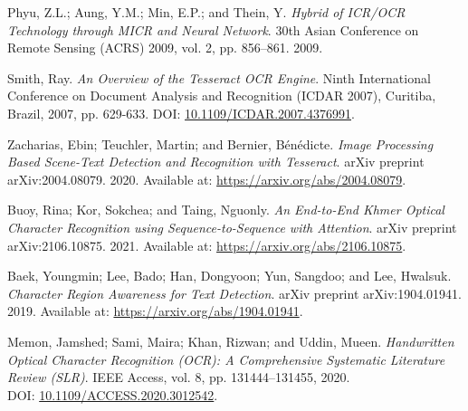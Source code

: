 \begin{thebibliography}{99}
Phyu, Z.L.; Aung, Y.M.; Min, E.P.; and Thein, Y.
\textit{Hybrid of ICR/OCR Technology through MICR and Neural Network}.
30th Asian Conference on Remote Sensing (ACRS) 2009, vol. 2, pp. 856–861.
2009.

Smith, Ray.
\textit{An Overview of the Tesseract OCR Engine}.
Ninth International Conference on Document Analysis and Recognition (ICDAR 2007), Curitiba, Brazil, 2007, pp. 629-633.
DOI: \href{https://doi.org/10.1109/ICDAR.2007.4376991}{10.1109/ICDAR.2007.4376991}.

Zacharias, Ebin; Teuchler, Martin; and Bernier, Bénédicte.
\textit{Image Processing Based Scene-Text Detection and Recognition with Tesseract}.
arXiv preprint arXiv:2004.08079.
2020.
Available at: \href{https://arxiv.org/abs/2004.08079}{https://arxiv.org/abs/2004.08079}.

Buoy, Rina; Kor, Sokchea; and Taing, Nguonly.
\textit{An End-to-End Khmer Optical Character Recognition using Sequence-to-Sequence with Attention}.
arXiv preprint arXiv:2106.10875.
2021.
Available at: \href{https://arxiv.org/abs/2106.10875}{https://arxiv.org/abs/2106.10875}.

Baek, Youngmin; Lee, Bado; Han, Dongyoon; Yun, Sangdoo; and Lee, Hwalsuk.
\textit{Character Region Awareness for Text Detection}.
arXiv preprint arXiv:1904.01941.
2019.
Available at: \href{https://arxiv.org/abs/1904.01941}{https://arxiv.org/abs/1904.01941}.

Memon, Jamshed; Sami, Maira; Khan, Rizwan; and Uddin, Mueen. 
\textit{Handwritten Optical Character Recognition (OCR): A Comprehensive Systematic Literature Review (SLR)}. 
IEEE Access, vol. 8, pp. 131444--131455, 2020. \\
DOI: \href{https://doi.org/10.1109/ACCESS.2020.3012542}{10.1109/ACCESS.2020.3012542}.

\end{thebibliography}
